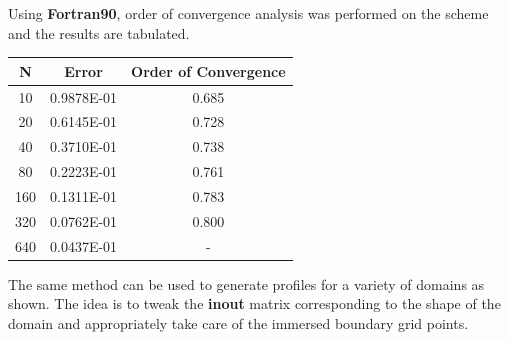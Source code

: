 \documentclass[11pt]{report}
\begin{document}
\noindent
Using \textbf{Fortran90}, order of convergence analysis was performed on the scheme and the results are tabulated.\\
\begin{center}
	\begin{tabular}{|c|c|c|}
	\hline
	N & Error & Order of Convergence\\
	\hline
	10 & 0.9878E-01 & 0.685 \\
	\hline
	20 & 0.6145E-01 & 0.728 \\
	\hline	
	40 & 0.3710E-01 & 0.738 \\
	\hline	
	80 & 0.2223E-01 & 0.761 \\
	\hline	
	160 & 0.1311E-01 & 0.783 \\
	\hline	
	320 & 0.0762E-01 & 0.800  \\
	\hline
	640 & 0.0437E-01 & -\\
	\hline
\end{tabular}
\end{center}

\noindent
The same method can be used to generate profiles for a variety of domains as shown. The idea is to tweak the \textbf{inout} matrix corresponding to the shape of the domain and appropriately take care of the immersed boundary grid points.
\end{document}
